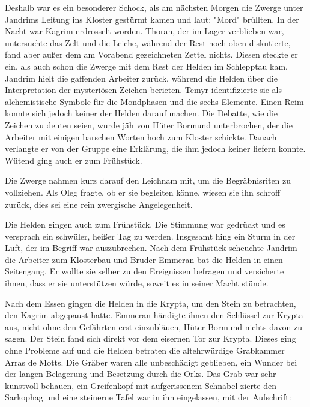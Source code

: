 \documentclass[11pt]{scrreprt}
\begin{document}
Deshalb war es ein besonderer Schock, als am nächsten Morgen die Zwerge unter Jandrims Leitung ins Kloster gestürmt kamen und laut: "Mord" brüllten. In der Nacht war Kagrim erdrosselt worden. Thoran, der im Lager verblieben war, untersuchte das Zelt und die Leiche, während der Rest noch oben diskutierte, fand aber außer dem am Vorabend gezeichneten Zettel nichts. Diesen steckte er ein, als auch schon die Zwerge mit dem Rest der Helden im Schlepptau kam. Jandrim hielt die gaffenden Arbeiter zurück, während die Helden über die Interpretation der mysteriösen Zeichen berieten. Temyr identifizierte sie als alchemistische Symbole für die Mondphasen und die sechs Elemente. Einen Reim konnte sich jedoch keiner der Helden darauf machen. Die Debatte, wie die Zeichen zu deuten seien, wurde jäh von Hüter Bormund unterbrochen, der die Arbeiter mit einigen barschen Worten hoch zum Kloster schickte. Danach verlangte er von der Gruppe eine Erklärung, die ihm jedoch keiner liefern konnte. Wütend ging auch er zum Frühstück.\par
Die Zwerge nahmen kurz darauf den Leichnam mit, um die Begräbnisriten zu vollziehen. Als Oleg fragte, ob er sie begleiten könne, wiesen sie ihn schroff zurück, dies sei eine rein zwergische Angelegenheit.\par
Die Helden gingen auch zum Frühstück. Die Stimmung war gedrückt und es versprach ein schwüler, heißer Tag zu werden. Insgesamt hing ein Sturm in der Luft, der im Begriff war auszubrechen. Nach dem Frühstück scheuchte Jandrim die Arbeiter zum Klosterbau und Bruder Emmeran bat die Helden in einen Seitengang. Er wollte sie selber zu den Ereignissen befragen und versicherte ihnen, dass er sie unterstützen würde, soweit es in seiner Macht stünde.\par
Nach dem Essen gingen die Helden in die Krypta, um den Stein zu betrachten, den Kagrim abgepaust hatte. Emmeran händigte ihnen den Schlüssel zur Krypta aus, nicht ohne den Gefährten erst einzubläuen, Hüter Bormund nichts davon zu sagen. Der Stein fand sich direkt vor dem eisernen Tor zur Krypta. Dieses ging ohne Probleme auf und die Helden betraten die altehrwürdige Grabkammer Arras de Motts. Die Gräber waren alle unbeschädigt geblieben, ein Wunder bei der langen Belagerung und Besetzung durch die Orks. Das Grab war sehr kunstvoll behauen, ein Greifenkopf mit aufgerissenem Schnabel zierte den Sarkophag und eine steinerne Tafel war in ihn eingelassen, mit der Aufschrift:\par
\end{document}
